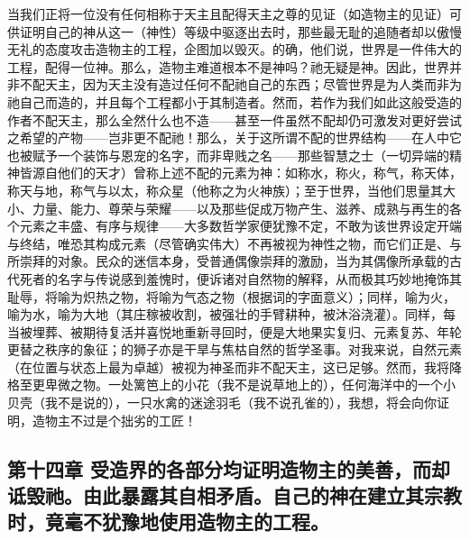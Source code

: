 当我们正将一位没有任何相称于天主且配得天主之尊的见证（如造物主的见证）可供证明自己的神从这一（神性）等级中驱逐出去时，那些最无耻的追随者却以傲慢无礼的态度攻击造物主的工程，企图加以毁灭。的确，他们说，世界是一件伟大的工程，配得一位神。那么，造物主难道根本不是神吗？祂无疑是神。因此，世界并非不配天主，因为天主没有造过任何不配祂自己的东西；尽管世界是为人类而非为祂自己而造的，并且每个工程都小于其制造者。然而，若作为我们如此这般受造的作者不配天主，那么全然什么也不造——甚至一件虽然不配却仍可激发对更好尝试之希望的产物——岂非更不配祂！那么，关于这所谓不配的世界结构——在人中它也被赋予一个装饰与恩宠的名字，而非卑贱之名——那些智慧之士（一切异端的精神皆源自他们的天才）曾称上述不配的元素为神：如称水，称火，称气，称天体，称天与地，称气与以太，称众星（他称之为火神族）；至于世界，当他们思量其大小、力量、能力、尊荣与荣耀——以及那些促成万物产生、滋养、成熟与再生的各个元素之丰盛、有序与规律——大多数哲学家便犹豫不定，不敢为该世界设定开端与终结，唯恐其构成元素（尽管确实伟大）不再被视为神性之物，而它们正是、与所崇拜的对象。民众的迷信本身，受普通偶像崇拜的激励，当为其偶像所承载的古代死者的名字与传说感到羞愧时，便诉诸对自然物的解释，从而极其巧妙地掩饰其耻辱，将喻为炽热之物，将喻为气态之物（根据词的字面意义）；同样，喻为火，喻为水，喻为大地（其庄稼被收割，被强壮的手臂耕种，被沐浴浇灌）。同样，每当被埋葬、被期待复活并喜悦地重新寻回时，便是大地果实复归、元素复苏、年轮更替之秩序的象征；的狮子亦是干旱与焦枯自然的哲学圣事。对我来说，自然元素（在位置与状态上最为卓越）被视为神圣而非不配天主，这已足够。然而，我将降格至更卑微之物。一处篱笆上的小花（我不是说草地上的），任何海洋中的一个小贝壳（我不是说的），一只水禽的迷途羽毛（我不说孔雀的），我想，将会向你证明，造物主不过是个拙劣的工匠！\par


\subsection{第十四章 受造界的各部分均证明造物主的美善，而却诋毁祂。由此暴露其自相矛盾。自己的神在建立其宗教时，竟毫不犹豫地使用造物主的工程。}

